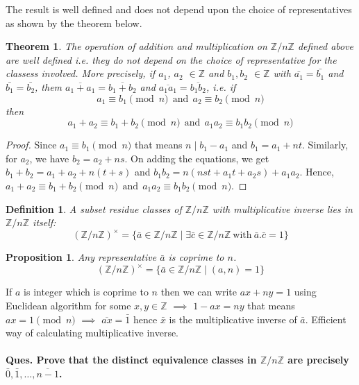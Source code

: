 \documentclass[12pt]{report}
\newtheorem{thm}{Theorem}
\newtheorem{defn}{Definition}
\newtheorem{prop}{Proposition}
\begin{document}
The result is well defined and does not depend upon the choice of representatives as shown by the theorem below.
\begin{thm}
    The operation of addition and multiplication on $\mathbb{Z}/n\mathbb{Z}$ defined above are well defined i.e. they do not depend on the choice of representative for the classess involved. More precisely, if $a_1$, $a_2$ $\in \mathbb{Z}$ and $b_1, b_2$ $\in \mathbb{Z}$ with $\bar{a_1} = \bar{b_1}$ and $\bar{b_1} = \bar{b_2}$, them $\overline{a_1 + a_1} = \overline{b_1 + b_2}$ and $\overline{a_1a_1} = \overline{b_1b_2}$, i.e. if 
    $$ a_1 \equiv b_1 \pmod n~~\text{and}~~a_2 \equiv b_2 \pmod n $$
    then 
    $$ a_1 + a_2 \equiv b_1 + b_2 \pmod n~~\text{and}~~ a_1a_2 \equiv b_1b_2 \pmod n $$
\end{thm}
\begin{proof}
    Since $a_1 \equiv b_1 \pmod n$ that means $n \mid b_1 - a_1$ and $ b_1 = a_1 + nt$. Similarly, for $a_2$, we have $ b_2 = a_2 + ns$. On adding the equations, we get $ b_1 + b_2 = a_1 + a_2 + n(t+s)$ and $b_1b_2 = n(nst + a_1t + a_2s) + a_1a_2 $. Hence, $a_1 + a_2 \equiv b_1 + b_2 \pmod n~~\text{and}~~ a_1a_2 \equiv b_1b_2 \pmod n$.
\end{proof}
\begin{defn}
    A subset residue classes of $\mathbb{Z}/n\mathbb{Z}$ with multiplicative inverse lies in $\mathbb{Z}/n\mathbb{Z}$ itself:
    $$ (\mathbb{Z}/n\mathbb{Z})^{\times} = \{ \bar{a} \in \mathbb{Z}/n\mathbb{Z} \mid \exists \bar{c} \in \mathbb{Z}/n\mathbb{Z} ~\text{with}~ \bar{a}.\bar{c} = 1\} $$
\end{defn}
\begin{prop}
    Any representative $\bar{a}$ is coprime to $n$.
    $$(\mathbb{Z}/n\mathbb{Z})^{\times} = \{\bar{a} \in \mathbb{Z}/n\mathbb{Z} \mid (a,n) = 1\}$$
\end{prop}
If $a$ is integer which is coprime to $n$ then we can write $ax + ny = 1$ using Euclidean algorithm for some $x,y \in \mathbb{Z}$ $\implies$ $1 - ax = ny$ that means $ax = 1 \pmod n$ $ \implies$ $\overline{ax} = \bar{1}$ hence $\bar{x}$ is the multiplicative inverse of $\bar{a}$. Efficient way of calculating multiplicative inverse.
\paragraph*{Ques. Prove that the distinct equivalence classes in $\mathbb{Z}/n\mathbb{Z}$ are precisely $\bar{0}, \bar{1}, \dots, \overline{n-1}$.}
\end{document}
